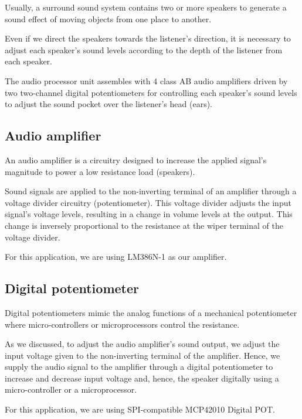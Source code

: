 \documentclass[../block_diagram_intro/block_diagram_intro.tex]{subfiles}
\begin{document}
Usually, a surround sound system contains two or more speakers to generate a sound 
effect of moving objects from one place to another.

Even if we direct the speakers towards the listener's direction, it is necessary to 
adjust each speaker's sound levels according to the depth of the listener from each 
speaker.

The audio processor unit assembles with 4 class AB audio amplifiers driven by two 
two-channel digital potentiometers for controlling each speaker's sound levels to adjust 
the sound pocket over the listener's head (ears).

\subsection{Audio amplifier}

An audio amplifier is a circuitry designed to increase the applied signal's magnitude 
to power a low resistance load (speakers).

Sound signals are applied to the non-inverting terminal of an amplifier through a 
voltage divider circuitry (potentiometer). This voltage divider adjusts the input 
signal's voltage levels, resulting in a change in volume levels at the output. This 
change is inversely proportional to the resistance at the wiper terminal of the voltage 
divider.

For this application, we are using LM386N-1 as our amplifier.

\subsection{Digital potentiometer}

Digital potentiometers mimic the analog functions of a mechanical potentiometer where 
micro-controllers or microprocessors control the resistance.

As we discussed, to adjust the audio amplifier's sound output, we adjust the input 
voltage given to the non-inverting terminal of the amplifier. Hence, we supply the 
audio signal to the amplifier through a digital potentiometer to increase and decrease 
input voltage and, hence, the speaker digitally using a micro-controller or a 
microprocessor.

For this application, we are using SPI-compatible MCP42010 Digital POT.
\end{document}
